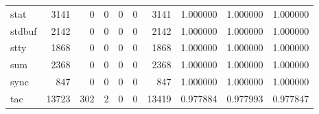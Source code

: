 \begin{longtable}{lrrrrrrrrr}
stat      &                                3141 &                                               0 &                                              0 &                                             0 &                                              0 &                                         3141 &                                           1.000000 &                               1.000000 &                             1.000000 \\
stdbuf    &                                2142 &                                               0 &                                              0 &                                             0 &                                              0 &                                         2142 &                                           1.000000 &                               1.000000 &                             1.000000 \\
stty      &                                1868 &                                               0 &                                              0 &                                             0 &                                              0 &                                         1868 &                                           1.000000 &                               1.000000 &                             1.000000 \\
sum       &                                2368 &                                               0 &                                              0 &                                             0 &                                              0 &                                         2368 &                                           1.000000 &                               1.000000 &                             1.000000 \\
sync      &                                 847 &                                               0 &                                              0 &                                             0 &                                              0 &                                          847 &                                           1.000000 &                               1.000000 &                             1.000000 \\
tac       &                               13723 &                                             302 &                                              2 &                                             0 &                                              0 &                                        13419 &                                           0.977884 &                               0.977993 &                             0.977847 \\

\end{longtable}
